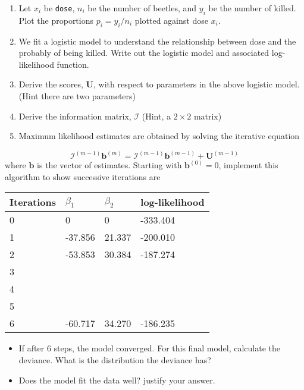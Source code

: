 \documentclass[
]{article}
\begin{document}
\begin{enumerate}
\def\labelenumi{\arabic{enumi}.}
\item
  Let \(x_i\) be \texttt{dose}, \(n_i\) be the number of beetles, and
  \(y_i\) be the number of killed. Plot the proportions
  \(p_i = y_i/n_i\) plotted against dose \(x_i\).
\item
  We fit a logistic model to understand the relationship between dose
  and the probably of being killed. Write out the logistic model and
  associated log-likelihood function.
\item
  Derive the scores, \(\mathbf{U}\), with respect to parameters in the
  above logistic model. (Hint there are two parameters)
\item
  Derive the information matrix, \(\mathcal{I}\) (Hint, a \(2\times 2\)
  matrix)
\item
  Maximum likelihood estimates are obtained by solving the iterative
  equation
\end{enumerate}

\[
\mathcal{I}^{(m-1)}\mathbf{b}^{(m)} = \mathcal{I}^{(m-1)}\mathbf{b}^{(m-1)}+ \mathbf{U}^{(m-1)}
\] where \(\mathbf{b}\) is the vector of estimates. Starting with
\(\mathbf{b}^{(0)} = 0\), implement this algorithm to show successive
iterations are

\begin{longtable}[]{@{}llll@{}}
\toprule()
Iterations & \(\beta_1\) & \(\beta_2\) & log-likelihood \\
\midrule()
\endhead
0 & 0 & 0 & -333.404 \\
1 & -37.856 & 21.337 & -200.010 \\
2 & -53.853 & 30.384 & -187.274 \\
3 & & & \\
4 & & & \\
5 & & & \\
6 & -60.717 & 34.270 & -186.235 \\
\bottomrule()
\end{longtable}

\begin{itemize}
\item
  If after 6 steps, the model converged. For this final model, calculate
  the deviance. What is the distribution the deviance has?
\item
  Does the model fit the data well? justify your answer.
\end{itemize}
\end{document}
